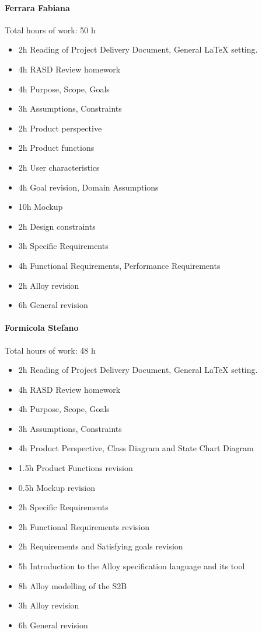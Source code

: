 \documentclass{report}
\begin{document}
		\paragraph{Ferrara Fabiana} Total hours of work: 50 h
			\begin{itemize}
				\item 2h Reading of Project Delivery Document, General LaTeX setting.
				\item 4h RASD Review homework
				\item 4h Purpose, Scope, Goals
				\item 3h Assumptions, Constraints
				\item 2h Product perspective
				\item 2h Product functions
				\item 2h User characteristics
				\item 4h Goal revision, Domain Assumptions
				\item 10h Mockup
				\item 2h Design constraints
				\item 3h Specific Requirements
				\item 4h Functional Requirements, Performance Requirements
				\item 2h Alloy revision
				\item 6h General revision
			\end{itemize}
		\paragraph{Formicola Stefano} Total hours of work: 48 h
			\begin{itemize}
				\item 2h Reading of Project Delivery Document, General LaTeX setting.
				\item 4h RASD Review homework
				\item 4h Purpose, Scope, Goals
				\item 3h Assumptions, Constraints
				\item 4h Product Perspective, Class Diagram and State Chart Diagram
				\item 1.5h Product Functions revision
				\item 0.5h Mockup revision
				\item 2h Specific Requirements
				\item 2h Functional Requirements revision
				\item 2h Requirements and Satisfying goals revision
				\item 5h Introduction to the Alloy specification language and its tool
				\item 8h Alloy modelling of the S2B
				\item 3h Alloy revision
				\item 6h General revision
			\end{itemize}
\end{document}
